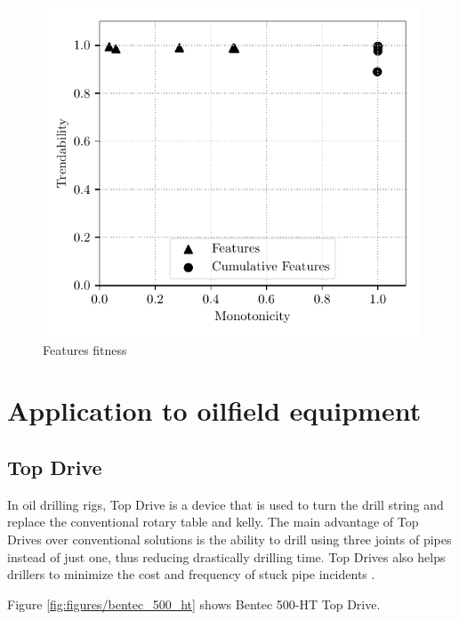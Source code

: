 \begin{figure}[H]
	\centering
	\includegraphics{figures/featuresfitness.pdf}
	\caption{Features fitness}%
	\label{fig:features_fitness}
\end{figure}

\section{Application to oilfield equipment}%
\label{sec:application_to_oilfield_equipment}

\subsection{Top Drive}%
\label{sub:top_drive}

In oil drilling rigs, Top Drive is a device that is used to turn the drill string and replace the conventional rotary table and kelly. The main advantage of Top Drives over conventional solutions is the ability to drill using three joints of pipes instead of just one, thus reducing drastically drilling time. Top Drives also helps drillers to minimize the cost and frequency of stuck pipe incidents \cite{slbtopdrive}.

Figure \ref{fig:figures/bentec_500_ht} shows Bentec 500-HT Top Drive.

